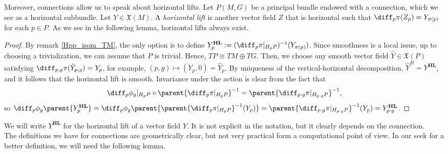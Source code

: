 
Moreover, connections allow us to speak about horizontal lifts. Let \(P(M,G)\) be a principal bundle endowed with a connection, which we see as a horizontal subbundle. Let \(Y\in \mathfrak{X}(M)\). A \textit{horizontal lift} is another vector field \(Z\) that is horizontal such that \(\diff_p\pi(Z_p)=Y_{\pi(p)}\) for each \(p \in P\). As we see in the following lemma, horizontal lifts always exist.

\begin{proof}
    By remark \ref{Hpp_isom_TM}, the only option is to define \(Y^{\mathbf{HL}}_p:=(\diff_p\pi|_{H_pP})^{-1}(Y_{\pi(p)})\). Since smoothness is a local issue, up to choosing a trivialization, we can assume that \(P\) is trivial. Hence, \(TP \cong TM \oplus TG\). Then, we choose any smooth vector field \(\hat{Y}\in \mathfrak{X}(P)\) satisfying \(\diff_{p,g}\pi(\hat{Y}_{p,g})=Y_p\), for example, \((p,g)\mapsto (Y_p,0)=\hat{Y}_p\). By uniqueness of the vertical-horizontal decomposition, \(\hat{Y}^H=Y^{\mathbf{HL}}\), and it follows that the horizontal lift is smooth. Invariance under the action is clear from the fact that
    \[
    \diff_p\phi_g|_{H_pP} \circ \parent{\diff_p\pi|_{H_pP}}^{-1}=\parent{\diff_{p\cdot g}\pi|_{H_{p\cdot g}P}}^{-1},
    \]
    so \(\diff_p\phi_g\parent{Y^{\mathbf{HL}}_p}=\diff_p\phi_g\parent{\parent{\diff_p\pi|_{H_pP}}^{-1}(Y_p)}=\parent{\diff_{p\cdot g}\pi|_{H_{p\cdot g}P}}^{-1}(Y_p)=Y^{\mathbf{HL}}_{p\cdot g}\).
\end{proof}
We will write \(Y^{\mathbf{HL}}\) for the horizontal lift of a vector field \(Y\). It is not explicit in the notation, but it clearly depends on the connection. \\

The definitions we have for connections are geometrically clear, but not very practical form a computational point of view. In our seek for a better definition, we will need the following lemma.

